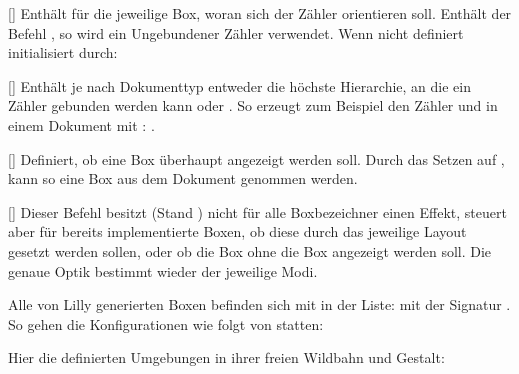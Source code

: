 %
%
%

[]
Enthält für die jeweilige Box, woran sich der Zähler orientieren soll. Enthält der Befehl \T{\true}, so wird ein Ungebundener Zähler verwendet. Wenn nicht definiert initialisiert durch:

%
%
%

[]
Enthält je nach Dokumenttyp entweder die höchste Hierarchie, an die ein Zähler gebunden werden kann oder \T{\true}. So erzeugt \T{\true} zum Beispiel den Zähler  und  in einem Dokument mit : .

%
%
%

[]
Definiert, ob eine Box überhaupt angezeigt werden soll. Durch das Setzen auf \T{\false}, kann so eine Box aus dem Dokument genommen werden.

%
%
%

[]
Dieser Befehl besitzt (Stand ) nicht für alle Boxbezeichner einen Effekt, steuert aber für bereits implementierte Boxen, ob diese durch das jeweilige Layout gesetzt werden sollen, oder ob die Box ohne die Box angezeigt werden soll. Die genaue Optik bestimmt wieder der jeweilige Modi.\newline

\begin{bemerkung}
    Alle von Lilly generierten Boxen befinden sich mit  in der Liste:  mit der Signatur . So gehen die Konfigurationen wie folgt von statten:
\end{bemerkung}
\iflillycompact\else
Hier die definierten Umgebungen in ihrer freien Wildbahn und Gestalt:

%

